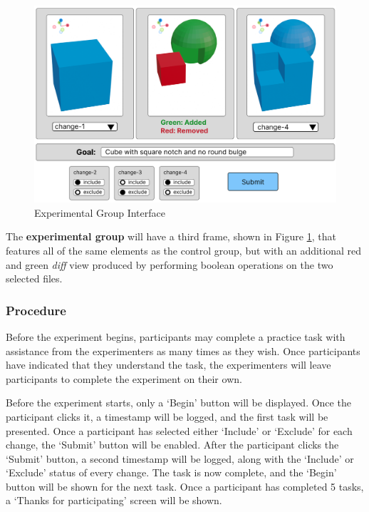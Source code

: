 \documentclass[sigconf,authorversion,nonacm]{acmart}
\begin{document}
\begin{figure}[h]
	\includegraphics[width=\linewidth]{experimentgroup.png}
	\caption{Experimental Group Interface}
	\label{fig:experimentgroup}
\end{figure}

The \textbf{experimental group} will have a third frame, shown in Figure \ref{fig:experimentgroup}, that features all of the same elements as the control group, but with an additional red and green \emph{diff} view produced by performing boolean operations on the two selected files.


\subsubsection{Procedure}

Before the experiment begins, participants may complete a practice task with assistance from the experimenters as many times as they wish.
Once participants have indicated that they understand the task, the experimenters will leave participants to complete the experiment on their own.

Before the experiment starts, only a `Begin' button will be displayed.
Once the participant clicks it, a timestamp will be logged, and the first task will be presented.
Once a participant has selected either `Include' or `Exclude' for each change, the `Submit' button will be enabled.
After the participant clicks the `Submit' button, a second timestamp will be logged, along with the `Include' or `Exclude' status of every change.
The task is now complete, and the `Begin' button will be shown for the next task.
Once a participant has completed 5 tasks, a `Thanks for participating' screen will be shown.
\end{document}
